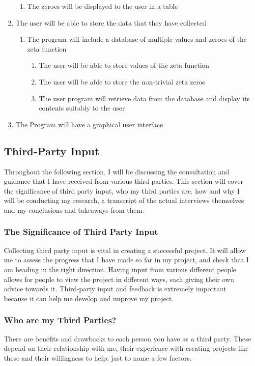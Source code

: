 \documentclass{article}
\begin{document}
\begin{enumerate}
\begin{enumerate}
        \item The zeroes will be displayed to the user in a table
    \end{enumerate}
    \item The user will be able to store the data that they have collected
    \begin{enumerate}
        \item The program will include a database of multiple values and zeroes of the zeta function
        \begin{enumerate}
            \item The user will be able to store values of the zeta function
            \item The user will be able to store the non-trivial zeta zeros
            \item The user program will retrieve data from the database and display its contents suitably to the user
        \end{enumerate}
    \end{enumerate}
    \item The Program will have a graphical user interface
\end{enumerate}
\clearpage
\subsection{Third-Party Input}

Throughout the following section, I will be discussing the consultation and guidance that I have received from various third parties. This section will cover the significance of third party input, who my third parties are, how and why I will be conducting my research, a transcript of the actual interviews themselves and my conclusions and takeaways from them.

\subsubsection{The Significance of Third Party Input}
Collecting third party input is vital in creating a successful project. It will allow me to assess the progress that I have made so far in my project, and check that I am heading in the right direction. Having input from various different people allows for people to view the project in different ways, each giving their own advice towards it. Third-party input and feedback is extremely important because it can help me develop and improve my project.

\subsubsection{Who are my Third Parties?}
There are benefits and drawbacks to each person you have as a third party. These depend on their relationship with me, their experience with creating projects like these and their willingness to help; just to name a few factors.
\end{document}
